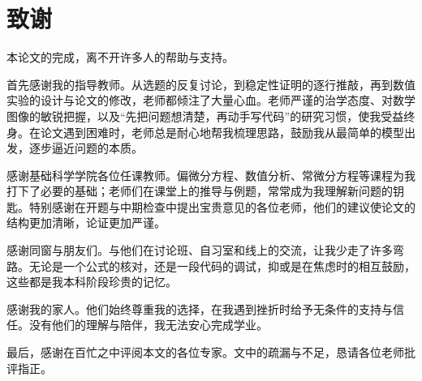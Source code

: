 \chapter*{\texorpdfstring{致\quad 谢}{致谢}}

本论文的完成，离不开许多人的帮助与支持。

首先感谢我的指导教师。从选题的反复讨论，到稳定性证明的逐行推敲，再到数值实验的设计与论文的修改，老师都倾注了大量心血。老师严谨的治学态度、对数学图像的敏锐把握，以及“先把问题想清楚，再动手写代码”的研究习惯，使我受益终身。在论文遇到困难时，老师总是耐心地帮我梳理思路，鼓励我从最简单的模型出发，逐步逼近问题的本质。

感谢基础科学学院各位任课教师。偏微分方程、数值分析、常微分方程等课程为我打下了必要的基础；老师们在课堂上的推导与例题，常常成为我理解新问题的钥匙。特别感谢在开题与中期检查中提出宝贵意见的各位老师，他们的建议使论文的结构更加清晰，论证更加严谨。

感谢同窗与朋友们。与他们在讨论班、自习室和线上的交流，让我少走了许多弯路。无论是一个公式的核对，还是一段代码的调试，抑或是在焦虑时的相互鼓励，这些都是我本科阶段珍贵的记忆。

感谢我的家人。他们始终尊重我的选择，在我遇到挫折时给予无条件的支持与信任。没有他们的理解与陪伴，我无法安心完成学业。

最后，感谢在百忙之中评阅本文的各位专家。文中的疏漏与不足，恳请各位老师批评指正。
